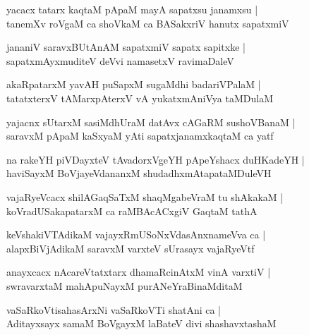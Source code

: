 \documentclass[twoside,12pt,openright]{book}
\newcounter{shloka}[chapter]
\begin{document}
\begin{shloka}%
yacacx tatarx kaqtaM pApaM mayA sapatxsu janamxsu |\\
tanemXv roVgaM ca shoVkaM ca BASakxriV hanutx sapatxmiV
\end{shloka}

\begin{shloka}%
jananiV saravxBUtAnAM sapatxmiV sapatx sapitxke |\\
sapatxmAyxmuditeV deVvi namasetxV ravimaDaleV 
\end{shloka}

\begin{shloka}%
akaRpatarxM yavAH puSapxM sugaMdhi  badariVPalaM |\\
tatatxterxV tAMarxpAterxV vA yukatxmAniVya taMDulaM
\end{shloka}

\begin{shloka}%
yajacnx sUtarxM sasiMdhUraM datAvx cAGaRM sushoVBanaM |\\
saravxM pApaM kaSxyaM yAti sapatxjanamxkaqtaM ca yatf 
\end{shloka}

\begin{shloka}%
na rakeYH piVDayxteV tAvadorxVgeYH pApeYshacx duHKadeYH |\\
haviSayxM BoVjayeVdananxM shudadhxmAtapataMDuleVH
\end{shloka}

\begin{shloka}%
vajaRyeVcacx shilAGaqSaTxM shaqMgabeVraM tu shAkakaM |\\
koVradUSakapatarxM ca raMBAcACxgiV GaqtaM tathA 
\end{shloka}

\begin{shloka}%
keVshakiVTAdikaM vajayxRmUSoNxVdasAnxnameVva ca |\\
alapxBiVjAdikaM saravxM varxteV sUrasayx vajaRyeVtf 
\end{shloka}

\begin{shloka}%
anayxcacx nAcareVtatxtarx dhamaRcinAtxM vinA varxtiV |\\
swravarxtaM mahApuNayxM purANeYraBinaMditaM 
\end{shloka}

\begin{shloka}%
vaSaRkoVtisahasArxNi vaSaRkoVTi shatAni ca |\\
Aditayxsayx samaM BoVgayxM laBateV divi shashavxtashaM 
\end{shloka}
\end{document}
